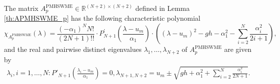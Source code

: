 \documentclass[10pt,a4paper]{amsart}
\begin{document}
\begin{theorem}\label{th:APMHSWME_p_chi}
    The matrix $A^{\textrm{PMHSWME}}_{p} \in \mathbb{R}^{(N+2)\times(N+2)}$ defined in Lemma \ref{th:APMHSWME_p} has the following characteristic polynomial
    \begin{equation}\label{eq:APMHSWME_p_char_poly}
        \chi_{A^{\textrm{PMHSWME}}_{p}}(\lambda) = \frac{(-\alpha_1)^NN!}{(2N+1)!!} \cdot P^{'}_{N+1}\left(\frac{\lambda-u_m}{\alpha_1}\right) \cdot \left( \left( \lambda - u_m \right)^2 - gh - \alpha_1^2 - \sum\limits_{i=2}^N\frac{\alpha_i^2}{2i+1}\right),
    \end{equation}
    and the real and pairwise distinct eigenvalues $\lambda_1, \ldots, \lambda_{N+2}$ of $A^{\textrm{PMHSWME}}_{p}$ are given by
    \begin{eqnarray}\label{eq:APMHSWME_p_EV}
        \lambda_i, i=1,\ldots, N: P'_{N+1}\left(\frac{\lambda_i - u_m}{\alpha_1}\right)=0,
        \lambda_{N+1,N+2} = u_m \pm \sqrt{gh + \alpha_1^2 + \sum\limits_{i=2}^N\frac{\alpha_i^2}{2N+1}}.
    \end{eqnarray}
\end{theorem}
\end{document}
